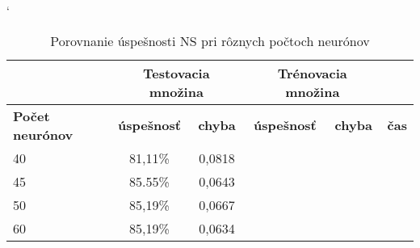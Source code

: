 \begin{table}[h]
\catcode` %
\centering
\begin{tabular}{|l|c|c|c|c|c|}
\cline{2-5}
\multicolumn{1}{l}{} & \multicolumn{2}{|c|}{\textbf{Testovacia množina}} & \multicolumn{2}{c|}{\textbf{Trénovacia množina}} & \multicolumn{1}{l}{}\\ 
\hline
\textbf{Počet neurónov} & \textbf{úspešnosť} & \textbf{chyba} & \textbf{úspešnosť} & \textbf{chyba} & \textbf{čas} \\ \hline
40 & 81,11\% & 0,0818 & & &\\ \hline
45 & 85.55\% & 0,0643 & & &\\ \hline
50 & 85,19\% & 0,0667 & & &\\ \hline
60 & 85,19\% & 0,0634 & & &\\ 
\hline
\end{tabular}
\caption{Porovnanie úspešnosti NS pri rôznych počtoch neurónov}
\label{tab:neuroncountcmp}
\end{table}






